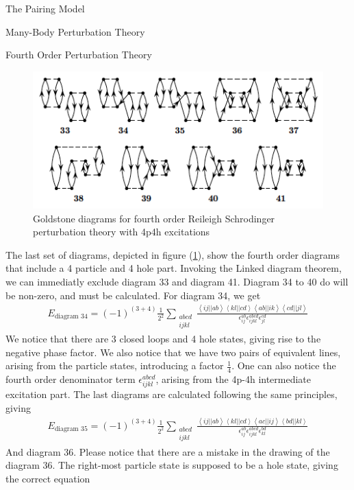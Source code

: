 \documentclass[twoside,english]{uiofysmaster}
\begin{document}
\begin{chapter}{The Pairing Model}
\begin{section}{Many-Body Perturbation Theory}
\begin{subsection}{Fourth Order Perturbation Theory}
			\begin{figure}[H]
				\includegraphics[width=\textwidth]{Figures/fourthorder4p4h.png}
				\caption{Goldstone diagrams for fourth order Reileigh Schrodinger perturbation theory with 4p4h excitations}
				\label{figure:mbpt4p4h}
			\end{figure}
			The last set of diagrams, depicted in figure (\ref{figure:mbpt4p4h}), show the fourth order diagrams that include a 4 particle and 4 hole part. Invoking the Linked diagram theorem, we can immediatly exclude diagram 33 and diagram 41. Diagram 34 to 40 do will be non-zero, and must be calculated. For diagram 34, we get
			\begin{align}
				E_{\text{diagram 34}} = \left(-1\right)^{(3+4)} \frac{1}{2^2} \sum_{\substack{abcd\\ijkl}} \frac{ \left<ij||ab\right>\left<kl||cd\right>\left<ab||ik\right>\left<cd||jl\right> }{ \epsilon_{ij}^{ab} \epsilon_{ijkl}^{abcd} \epsilon_{jl}^{cd} }
			\end{align}
			We notice that there are 3 closed loops and 4 hole states, giving rise to the negative phase factor. We also notice that we have two pairs of equivalent lines, arising from the particle states, introducing a factor $\frac{1}{4}$. One can also notice the fourth order denominator term $\epsilon_{ijkl}^{abcd}$, arising from the 4p-4h intermediate excitation part. The last diagrams are calculated following the same principles, giving 
			\begin{align}
				E_{\text{diagram 35}} = \left(-1\right)^{(3+4)} \frac{1}{2^2} \sum_{\substack{abcd\\ijkl}} \frac{ \left<ij||ab\right>\left<kl||cd\right>\left<ac||ij\right>\left<bd||kl\right> }{ \epsilon_{ij}^{ab} \epsilon_{ijkl}^{abcd} \epsilon_{kl}^{bd} }
			\end{align}
			And diagram 36. Please notice that there are a mistake in the drawing of the diagram 36. The right-most particle state is supposed to be a hole state, giving the correct equation 

\end{subsection}
\end{section}
\end{chapter}
\end{document}
